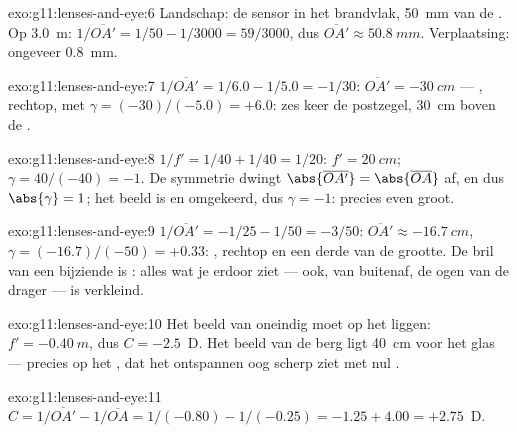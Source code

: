\begin{solution}{exo:g11:lenses-and-eye:6}
Landschap: de sensor in het brandvlak, \qty{50}{mm} van de . Op
\qty{3.0}{m}: $1/\overline{OA'} = 1/50 - 1/3000 = 59/3000$, dus
$\overline{OA'} \approx \qty{50.8}{mm}$. Verplaatsing: ongeveer
\qty{0.8}{mm}.
\end{solution}

\begin{solution}{exo:g11:lenses-and-eye:7}
$1/\overline{OA'} = 1/6.0 - 1/5.0 = -1/30$:
$\overline{OA'} = \qty{-30}{cm}$ --- , rechtop, met
$\gamma = (-30)/(-5.0) = +6.0$: zes keer de postzegel, \qty{30}{cm} boven
de .
\end{solution}

\begin{solution}{exo:g11:lenses-and-eye:8}
$1/f' = 1/40 + 1/40 = 1/20$: $f' = \qty{20}{cm}$;
$\gamma = 40/(-40) = -1$. De symmetrie dwingt
$\abs{\overline{OA'}} = \abs{\overline{OA}}$ af, en dus
$\abs{\gamma} = 1$; het beeld is  en omgekeerd, dus $\gamma = -1$:
precies even groot.
\end{solution}

\begin{solution}{exo:g11:lenses-and-eye:9}
$1/\overline{OA'} = -1/25 - 1/50 = -3/50$:
$\overline{OA'} \approx \qty{-16.7}{cm}$,
$\gamma = (-16.7)/(-50) = +0.33$: , rechtop en een derde van de
grootte. De bril van een bijziende is : alles wat je erdoor
ziet --- ook, van buitenaf, de ogen van de drager --- is verkleind.
\end{solution}

\begin{solution}{exo:g11:lenses-and-eye:10}
Het beeld van oneindig moet op het  liggen:
$f' = \qty{-0.40}{m}$, dus $C = -2.5$~D. Het beeld van de berg ligt
\qty{40}{cm} voor het glas --- precies op het , dat het
ontspannen oog scherp ziet met nul .
\end{solution}

\begin{solution}{exo:g11:lenses-and-eye:11}
$C = 1/\overline{OA'} - 1/\overline{OA} = 1/(-0.80) - 1/(-0.25)
= -1.25 + 4.00 = +2.75$~D.
\end{solution}

